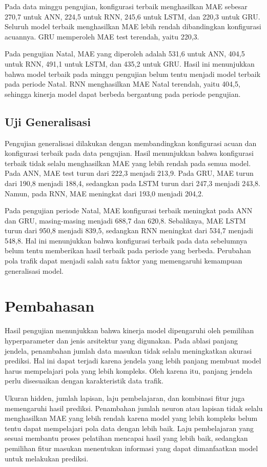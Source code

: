\documentclass[conference,a4paper]{IEEEtran}
\begin{document}
Pada data minggu pengujian, konfigurasi terbaik menghasilkan MAE sebesar 270,7 untuk ANN, 224,5 untuk RNN, 245,6 untuk LSTM, dan 220,3 untuk GRU. Seluruh model terbaik menghasilkan MAE lebih rendah dibandingkan konfigurasi acuannya. GRU memperoleh MAE test terendah, yaitu 220,3.

Pada pengujian Natal, MAE yang diperoleh adalah 531,6 untuk ANN, 404,5 untuk RNN, 491,1 untuk LSTM, dan 435,2 untuk GRU. Hasil ini menunjukkan bahwa model terbaik pada minggu pengujian belum tentu menjadi model terbaik pada periode Natal. RNN menghasilkan MAE Natal terendah, yaitu 404,5, sehingga kinerja model dapat berbeda bergantung pada periode pengujian.
\subsection{Uji Generalisasi}
Pengujian generalisasi dilakukan dengan membandingkan konfigurasi acuan dan konfigurasi terbaik pada data pengujian. Hasil menunjukkan bahwa konfigurasi terbaik tidak selalu menghasilkan MAE yang lebih rendah pada semua model. Pada ANN, MAE test turun dari 222,3 menjadi 213,9. Pada GRU, MAE turun dari 190,8 menjadi 188,4, sedangkan pada LSTM turun dari 247,3 menjadi 243,8. Namun, pada RNN, MAE meningkat dari 193,0 menjadi 204,2.

Pada pengujian periode Natal, MAE konfigurasi terbaik meningkat pada ANN dan GRU, masing-masing menjadi 688,7 dan 620,8. Sebaliknya, MAE LSTM turun dari 950,8 menjadi 839,5, sedangkan RNN meningkat dari 534,7 menjadi 548,8. Hal ini menunjukkan bahwa konfigurasi terbaik pada data sebelumnya belum tentu memberikan hasil terbaik pada periode yang berbeda. Perubahan pola trafik dapat menjadi salah satu faktor yang memengaruhi kemampuan generalisasi model.
\section{Pembahasan}
Hasil pengujian menunjukkan bahwa kinerja model dipengaruhi oleh pemilihan hyperparameter dan jenis arsitektur yang digunakan. Pada ablasi panjang jendela, penambahan jumlah data masukan tidak selalu meningkatkan akurasi prediksi. Hal ini dapat terjadi karena jendela yang lebih panjang membuat model harus mempelajari pola yang lebih kompleks. Oleh karena itu, panjang jendela perlu disesuaikan dengan karakteristik data trafik.

Ukuran hidden, jumlah lapisan, laju pembelajaran, dan kombinasi fitur juga memengaruhi hasil prediksi. Penambahan jumlah neuron atau lapisan tidak selalu menghasilkan MAE yang lebih rendah karena model yang lebih kompleks belum tentu dapat mempelajari pola data dengan lebih baik. Laju pembelajaran yang sesuai membantu proses pelatihan mencapai hasil yang lebih baik, sedangkan pemilihan fitur masukan menentukan informasi yang dapat dimanfaatkan model untuk melakukan prediksi.
\end{document}
